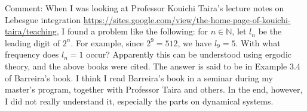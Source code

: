 Comment: When I was looking at Professor Kouichi Taira's lecture notes on Lebesgue integration \url{https://sites.google.com/view/the-home-page-of-kouichi-taira/teaching}, I found a problem like the following: for $n \in \mathbb{N}$, let $l_n$ be the leading digit of $2^{n}$. For example, since $2^9=512$, we have $l_9=5$. With what frequency does $l_n=1$ occur? Apparently this can be understood using ergodic theory, and the above books were cited. The answer is said to be in Example 3.4 of Barreira's book. I think I read Barreira's book in a seminar during my master's program, together with Professor Taira and others. In the end, however, I did not really understand it, especially the parts on dynamical systems.
